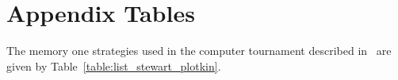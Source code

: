 \section{Appendix Tables}\label{appendix:tables}

The memory one strategies used in the computer tournament described in~\cite{Stewart2012}
are given by Table~\ref{table:list_stewart_plotkin}.


